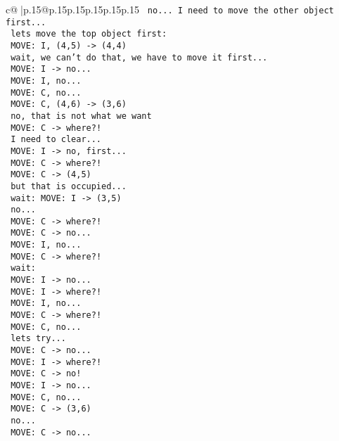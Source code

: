 \documentclass{article}
\begin{document}
{\begin{supertabular}{c@{$\;$}|p{.15\linewidth}@{}p{.15\linewidth}p{.15\linewidth}p{.15\linewidth}p{.15\linewidth}p{.15\linewidth}}
{{{\texttt{ no... I need to move the other object first...} \\
\texttt{ lets move the top object first: } \\
\texttt{ MOVE: I, (4,5) {-}> (4,4) } \\
\texttt{ wait, we can't do that, we have to move it first...} \\
\texttt{ MOVE: I {-}> no...} \\
\texttt{ MOVE: I, no...} \\
\texttt{ MOVE: C, no... } \\
\texttt{ MOVE: C, (4,6) {-}> (3,6) } \\
\texttt{ no, that is not what we want} \\
\texttt{ MOVE: C {-}> where?!} \\
\texttt{ I need to clear...} \\
\texttt{ MOVE: I {-}> no, first...} \\
\texttt{ MOVE: C {-}> where?!} \\
\texttt{ MOVE: C {-}> (4,5) } \\
\texttt{ but that is occupied...} \\
\texttt{ wait: MOVE: I {-}> (3,5) } \\
\texttt{ no... } \\
\texttt{ MOVE: C {-}> where?!} \\
\texttt{ MOVE: C {-}> no...} \\
\texttt{ MOVE: I, no...} \\
\texttt{ MOVE: C {-}> where?!} \\
\texttt{ wait: } \\
\texttt{ MOVE: I {-}> no...} \\
\texttt{ MOVE: I {-}> where?!} \\
\texttt{ MOVE: I, no...} \\
\texttt{ MOVE: C {-}> where?!} \\
\texttt{ MOVE: C, no...} \\
\texttt{ lets try...} \\
\texttt{ MOVE: C {-}> no...} \\
\texttt{ MOVE: I {-}> where?!} \\
\texttt{ MOVE: C {-}> no!} \\
\texttt{ MOVE: I {-}> no...} \\
\texttt{ MOVE: C, no...} \\
\texttt{ MOVE: C {-}> (3,6) } \\
\texttt{ no...} \\
\texttt{ MOVE: C {-}> no...} \\
}}}
\end{supertabular}}
\end{document}
